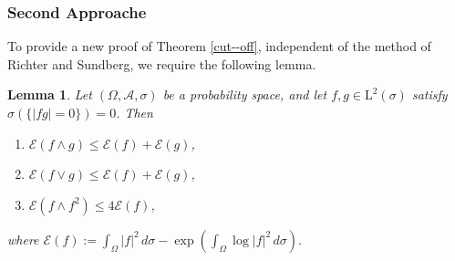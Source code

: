 \documentclass[12pt,reqno,a4paper]{amsart}
\newtheorem{lem}[prop]{Lemma}
\newcommand{\cA}{{\mathcal{A}}}
\numberwithin{equation}{section}
\begin{document}
\subsubsection{Second Approache}%
To provide a new proof of Theorem \ref{cut--off}, independent of the method of Richter and Sundberg, we require the following lemma.
\begin{lem}\label{LemmaCutoff}
	Let \((\Omega,\mathcal{A},\sigma)\) be a probability space, and let \(f,g \in \mathrm{L}^2(\sigma)\) satisfy \(\sigma(\{|fg|=0\})=0\). Then
	\begin{enumerate}
		\item[A.] $\mathcal{E}(f\wedge g)\leq \mathcal{E}(f)+\mathcal{E}(g) $,
		\item[B.] $\mathcal{E}(f\vee g)\leq \mathcal{E}(f)+\mathcal{E}(g) $,
		\item[C.]  $\mathcal{E}(f\wedge f^2)\leq 4\mathcal{E}(f)$,
	\end{enumerate}
	where
	\(
	\mathcal{E}(f)
	:= \int_\Omega |f|^2\, d\sigma
	- \exp\!\left(\int_\Omega \log |f|^2\, d\sigma\right).
	\)
\end{lem}
\end{document}
